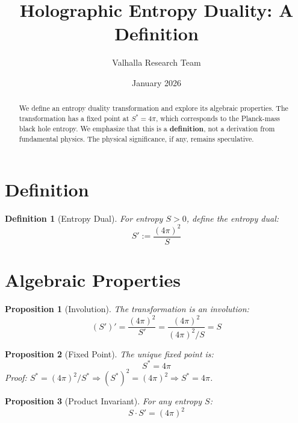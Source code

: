 \documentclass[11pt,a4paper]{article}
\title{Holographic Entropy Duality: A Definition}
\author{Valhalla Research Team}
\date{January 2026}
\newtheorem{definition}{Definition}
\newtheorem{proposition}{Proposition}
\begin{document}
\maketitle

\begin{abstract}
We define an entropy duality transformation and explore its algebraic properties. The transformation has a fixed point at $S^* = 4\pi$, which corresponds to the Planck-mass black hole entropy. We emphasize that this is a \textbf{definition}, not a derivation from fundamental physics. The physical significance, if any, remains speculative.
\end{abstract}

\section{Definition}

\begin{definition}[Entropy Dual]
For entropy $S > 0$, define the entropy dual:
\begin{equation}
S' := \frac{(4\pi)^2}{S}
\end{equation}
\end{definition}

\section{Algebraic Properties}

\begin{proposition}[Involution]
The transformation is an involution:
\begin{equation}
(S')' = \frac{(4\pi)^2}{S'} = \frac{(4\pi)^2}{(4\pi)^2/S} = S
\end{equation}
\end{proposition}

\begin{proposition}[Fixed Point]
The unique fixed point is:
\begin{equation}
S^* = 4\pi
\end{equation}
Proof: $S^* = (4\pi)^2/S^* \Rightarrow (S^*)^2 = (4\pi)^2 \Rightarrow S^* = 4\pi$.
\end{proposition}

\begin{proposition}[Product Invariant]
For any entropy $S$:
\begin{equation}
S \cdot S' = (4\pi)^2
\end{equation}
\end{proposition}
\end{document}
